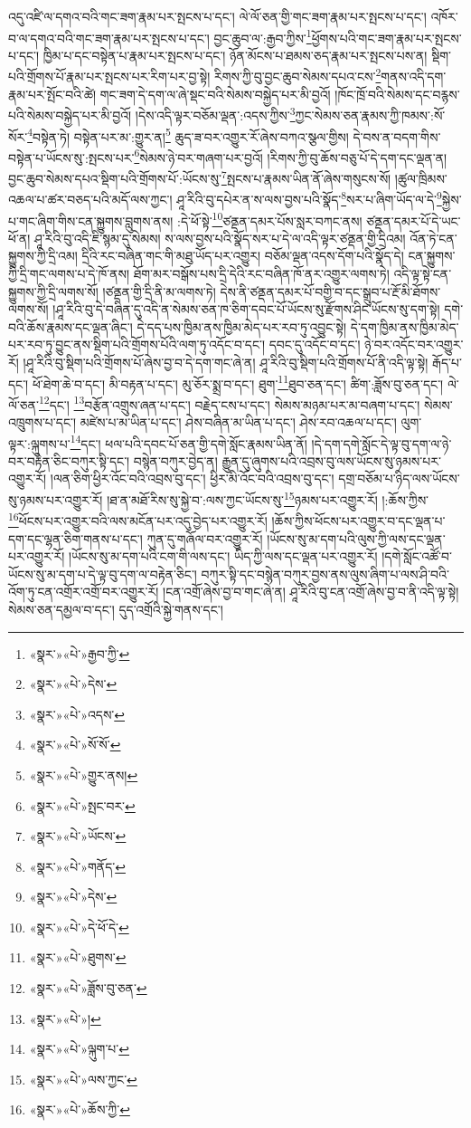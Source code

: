 འདུ་འཛི་ལ་དགའ་བའི་གང་ཟག་རྣམ་པར་སྤངས་པ་དང་། ལེ་ལོ་ཅན་གྱི་གང་ཟག་རྣམ་པར་སྤངས་པ་དང་། འཁོར་བ་ལ་དགའ་བའི་གང་ཟག་རྣམ་པར་སྤངས་པ་དང་། བྱང་ཆུབ་ལ་:རྒྱབ་ཀྱིས་\footnote{«སྣར་»«པེ་»རྒྱབ་ཀྱི་}ཕྱོགས་པའི་གང་ཟག་རྣམ་པར་སྤངས་པ་དང་། ཁྱིམ་པ་དང་བསྟེན་པ་རྣམ་པར་སྤངས་པ་དང་། ཉོན་མོངས་པ་ཐམས་ཅད་རྣམ་པར་སྤངས་པས་ན། སྡིག་པའི་གྲོགས་པོ་རྣམ་པར་སྤངས་པར་རིག་པར་བྱ་སྟེ། རིགས་ཀྱི་བུ་བྱང་ཆུབ་སེམས་དཔའ་ངས་\footnote{«སྣར་»«པེ་»དེས་}གནས་འདི་དག་རྣམ་པར་སྤོང་བའི་ཚེ། གང་ཟག་དེ་དག་ལ་ཞེ་སྡང་བའི་སེམས་བསྐྱེད་པར་མི་བྱའོ། །ཁོང་ཁྲོ་བའི་སེམས་དང་བརྙས་པའི་སེམས་བསྐྱེད་པར་མི་བྱའོ། །དེས་འདི་ལྟར་བཅོམ་ལྡན་:འདས་ཀྱིས་\footnote{«སྣར་»«པེ་»འདས་}ཀྱང་སེམས་ཅན་རྣམས་ཀྱི་ཁམས་:སོ་སོར་\footnote{«སྣར་»«པེ་»སོ་སོ་}བསྟེན་ཏེ། བསྟེན་པར་མ་:གྱུར་ན།\footnote{«སྣར་»«པེ་»གྱུར་ནས།} ཆུད་ཟ་བར་འགྱུར་རོ་ཞེས་བཀའ་སྩལ་གྱིས། དེ་བས་ན་བདག་གིས་བསྟེན་པ་ཡོངས་སུ་:སྤངས་པར་\footnote{«སྣར་»«པེ་»སྤང་བར་}སེམས་ཉེ་བར་གཞག་པར་བྱའོ། །རིགས་ཀྱི་བུ་ཆོས་བཅུ་པོ་དེ་དག་དང་ལྡན་ན། བྱང་ཆུབ་སེམས་དཔའ་སྡིག་པའི་གྲོགས་པོ་:ཡོངས་སུ་\footnote{«སྣར་»«པེ་»ཡོངས་}སྤངས་པ་རྣམས་ཡིན་ནོ་ཞེས་གསུངས་སོ། །ཚུལ་ཁྲིམས་འཆལ་པ་ཚར་བཅད་པའི་མདོ་ལས་ཀྱང་། ཤཱ་རིའི་བུ་དཔེར་ན་ས་ལས་བྱས་པའི་སྣོད་\footnote{«སྣར་»«པེ་»གནོད་}སར་པ་ཞིག་ཡོད་ལ་དེ་\footnote{«སྣར་»«པེ་»དེས་}སྐྱེས་པ་གང་ཞིག་གིས་ངན་སྐྱུགས་བླུགས་ནས། :དེ་ཕོ་སྟེ་\footnote{«སྣར་»«པེ་»དེ་ཕོ་དེ་}ཙནྡན་དམར་པོས་སླར་བཀང་ནས། ཙནྡན་དམར་པོ་དེ་ཡང་ཕོ་ན། ཤཱ་རིའི་བུ་འདི་ཇི་སྙམ་དུ་སེམས། ས་ལས་བྱས་པའི་སྣོད་སར་པ་དེ་ལ་འདི་ལྟར་ཙནྡན་གྱི་དྲིའམ། འོན་ཏེ་ངན་སྐྱུགས་ཀྱི་དྲི་འམ། དྲིའི་རང་བཞིན་གང་གི་མཐུ་ཡོད་པར་འགྱུར། བཅོམ་ལྡན་འདས་དོག་པའི་སྣོད་དེ། ངན་སྐྱུགས་ཀྱི་དྲི་གང་ལགས་པ་དེ་ཁོ་ནས། ཐོག་མར་བསྒོས་པས་དྲི་དེའི་རང་བཞིན་ཁོ་ནར་འགྱུར་ལགས་ཏེ། འདི་ལྟ་སྟེ་ངན་སྐྱུགས་ཀྱི་དྲི་ལགས་སོ། །ཙནྡན་གྱི་དྲི་ནི་མ་ལགས་ཏེ། དེས་ནི་ཙནྡན་དམར་པོ་བགྱི་བ་དང་སྒྲུབ་པ་རྔོ་མི་ཐོགས་ལགས་སོ། །ཤཱ་རིའི་བུ་དེ་བཞིན་དུ་འདི་ན་སེམས་ཅན་ཁ་ཅིག་དབང་པོ་ཡོངས་སུ་རྫོགས་ཤིང་ཡོངས་སུ་དག་སྟེ། དགེ་བའི་ཆོས་རྣམས་དང་ལྡན་ཞིང་། དེ་དད་པས་ཁྱིམ་ནས་ཁྱིམ་མེད་པར་རབ་ཏུ་འབྱུང་སྟེ། དེ་དག་ཁྱིམ་ནས་ཁྱིམ་མེད་པར་རབ་ཏུ་བྱུང་ནས་སྡིག་པའི་གྲོགས་པོའི་ལག་ཏུ་འདོང་བ་དང་། དབང་དུ་འདོང་བ་དང་། ཉེ་བར་འདོང་བར་འགྱུར་རོ། །ཤཱ་རིའི་བུ་སྡིག་པའི་གྲོགས་པོ་ཞེས་བྱ་བ་དེ་དག་གང་ཞེ་ན། ཤཱ་རིའི་བུ་སྡིག་པའི་གྲོགས་པོ་ནི་འདི་ལྟ་སྟེ། རྒོད་པ་དང་། ཕོ་ཐེག་ཆེ་བ་དང་། མི་བརྟན་པ་དང་། མུ་ཅོར་སྨྲ་བ་དང་། ཐུག་\footnote{«སྣར་»«པེ་»ཐུགས་}ཐུབ་ཅན་དང་། ཚིག་:ཟློས་བུ་ཅན་དང་། ལེ་ལོ་ཅན་\footnote{«སྣར་»«པེ་»ཟློས་བུ་ཅན་}དང་། \footnote{«སྣར་»«པེ་»།  }བརྩོན་འགྲུས་ཞན་པ་དང་། བརྗེད་ངས་པ་དང་། སེམས་མཉམ་པར་མ་བཞག་པ་དང་། སེམས་འཁྲུགས་པ་དང་། མཛེས་པ་མ་ཡིན་པ་དང་། ཤེས་བཞིན་མ་ཡིན་པ་དང་། ཤེས་རབ་འཆལ་པ་དང་། ལུག་ལྟར་:ལྐུགས་པ་\footnote{«སྣར་»«པེ་»ལྐུག་པ་}དང་། ཕལ་པའི་དབང་པོ་ཅན་གྱི་དགེ་སློང་རྣམས་ཡིན་ནོ། །དེ་དག་དགེ་སློང་དེ་ལྟ་བུ་དག་ལ་ཉེ་བར་བརྟེན་ཅིང་བཀུར་སྟི་དང་། བསྙེན་བཀུར་བྱེད་ན། རྒྱུན་དུ་ཞུགས་པའི་འབྲས་བུ་ལས་ཡོངས་སུ་ཉམས་པར་འགྱུར་རོ། །ལན་ཅིག་ཕྱིར་འོང་བའི་འབྲས་བུ་དང་། ཕྱིར་མི་འོང་བའི་འབྲས་བུ་དང་། དགྲ་བཅོམ་པ་ཉིད་ལས་ཡོངས་སུ་ཉམས་པར་འགྱུར་རོ། །ཐ་ན་མཐོ་རིས་སུ་སྐྱེ་བ་:ལས་ཀྱང་ཡོངས་སུ་\footnote{«སྣར་»«པེ་»ལས་ཀྱང་}ཉམས་པར་འགྱུར་རོ། །:ཆོས་ཀྱིས་\footnote{«སྣར་»«པེ་»ཆོས་ཀྱི་}ཕོངས་པར་འགྱུར་བའི་ལས་མངོན་པར་འདུ་བྱེད་པར་འགྱུར་རོ། །ཆོས་ཀྱིས་ཕོངས་པར་འགྱུར་བ་དང་ལྡན་པ་དག་དང་ལྷན་ཅིག་གནས་པ་དང་། ཀུན་དུ་གཞོལ་བར་འགྱུར་རོ། །ཡོངས་སུ་མ་དག་པའི་ལུས་ཀྱི་ལས་དང་ལྡན་པར་འགྱུར་རོ། །ཡོངས་སུ་མ་དག་པའི་ངག་གི་ལས་དང་། ཡིད་ཀྱི་ལས་དང་ལྡན་པར་འགྱུར་རོ། །དགེ་སློང་འཚོ་བ་ཡོངས་སུ་མ་དག་པ་དེ་ལྟ་བུ་དག་ལ་བརྟེན་ཅིང་། བཀུར་སྟི་དང་བསྙེན་བཀུར་བྱས་ནས་ལུས་ཞིག་པ་ལས་ཤི་བའི་འོག་ཏུ་ངན་འགྲོར་འགྲོ་བར་འགྱུར་རོ། །ངན་འགྲོ་ཞེས་བྱ་བ་གང་ཞེ་ན། ཤཱ་རིའི་བུ་ངན་འགྲོ་ཞེས་བྱ་བ་ནི་འདི་ལྟ་སྟེ། སེམས་ཅན་དམྱལ་བ་དང་། དུད་འགྲོའི་སྐྱེ་གནས་དང་། 